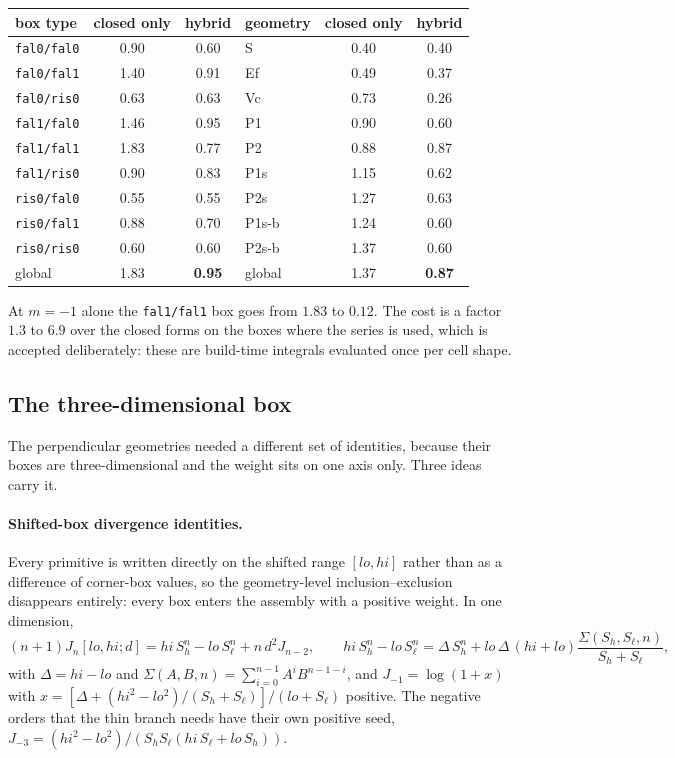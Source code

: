 \documentclass[11pt]{article}
\theoremstyle{remark}
\newcommand{\code}[1]{\texttt{#1}}
\begin{document}
\begin{center}\small
\begin{tabular}{@{}lcc@{\hskip 2em}lcc@{}}
\toprule
box type & closed only & hybrid & geometry & closed only & hybrid\\
\midrule
\code{fal0/fal0} & 0.90 & 0.60 & S     & 0.40 & 0.40\\
\code{fal0/fal1} & 1.40 & 0.91 & Ef    & 0.49 & 0.37\\
\code{fal0/ris0} & 0.63 & 0.63 & Vc    & 0.73 & 0.26\\
\code{fal1/fal0} & 1.46 & 0.95 & P1    & 0.90 & 0.60\\
\code{fal1/fal1} & 1.83 & 0.77 & P2    & 0.88 & 0.87\\
\code{fal1/ris0} & 0.90 & 0.83 & P1s   & 1.15 & 0.62\\
\code{ris0/fal0} & 0.55 & 0.55 & P2s   & 1.27 & 0.63\\
\code{ris0/fal1} & 0.88 & 0.70 & P1s-b & 1.24 & 0.60\\
\code{ris0/ris0} & 0.60 & 0.60 & P2s-b & 1.37 & 0.60\\
\midrule
global & 1.83 & \textbf{0.95} & global & 1.37 & \textbf{0.87}\\
\bottomrule
\end{tabular}
\end{center}
\noindent
At $m = -1$ alone the \code{fal1/fal1} box goes from $1.83$ to $0.12$. The cost is a factor
$1.3$ to $6.9$ over the closed forms on the boxes where the series is used, which is
accepted deliberately: these are build-time integrals evaluated once per cell shape.

\subsection{The three-dimensional box}
\label{sec:cancel3}

The perpendicular geometries needed a different set of identities, because their boxes are
three-dimensional and the weight sits on one axis only. Three ideas carry it.

\paragraph{Shifted-box divergence identities.} Every primitive is written directly on the
shifted range $[lo, hi]$ rather than as a difference of corner-box values, so the
geometry-level inclusion--exclusion disappears entirely: every box enters the assembly with
a positive weight. In one dimension,
\begin{equation}
(n+1)J_n[lo,hi;d] = hi\,S_h^n - lo\,S_\ell^n + n\,d^2 J_{n-2},
\qquad
hi\,S_h^n - lo\,S_\ell^n = \Delta\,S_h^n + lo\,\Delta\,(hi+lo)\frac{\Sigma(S_h,S_\ell,n)}{S_h+S_\ell},
\end{equation}
with $\Delta = hi - lo$ and $\Sigma(A,B,n) = \sum_{i=0}^{n-1}A^iB^{n-1-i}$, and
$J_{-1} = \log(1+x)$ with $x = [\Delta + (hi^2-lo^2)/(S_h+S_\ell)]/(lo+S_\ell)$ positive.
The negative orders that the thin branch needs have their own positive seed,
$J_{-3} = (hi^2-lo^2)/(S_hS_\ell(hi\,S_\ell + lo\,S_h))$.
\end{document}
